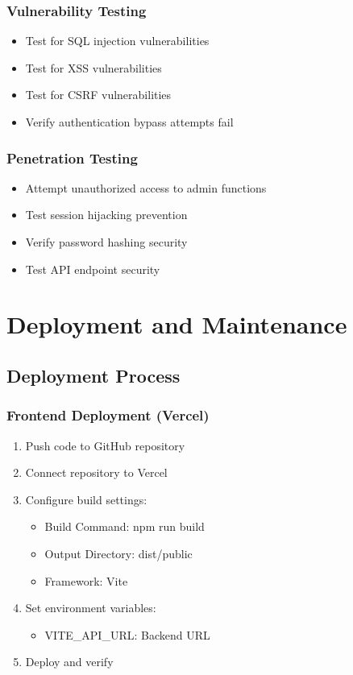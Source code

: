 \documentclass{scrreprt}
\begin{document}
\subsection{Vulnerability Testing}
\begin{itemize}
\item Test for SQL injection vulnerabilities
\item Test for XSS vulnerabilities
\item Test for CSRF vulnerabilities
\item Verify authentication bypass attempts fail
\end{itemize}

\subsection{Penetration Testing}
\begin{itemize}
\item Attempt unauthorized access to admin functions
\item Test session hijacking prevention
\item Verify password hashing security
\item Test API endpoint security
\end{itemize}

\chapter{Deployment and Maintenance}

\section{Deployment Process}

\subsection{Frontend Deployment (Vercel)}
\begin{enumerate}
\item Push code to GitHub repository
\item Connect repository to Vercel
\item Configure build settings:
\begin{itemize}
\item Build Command: npm run build
\item Output Directory: dist/public
\item Framework: Vite
\end{itemize}
\item Set environment variables:
\begin{itemize}
\item VITE\_API\_URL: Backend URL
\end{itemize}
\item Deploy and verify
\end{enumerate}
\end{document}
